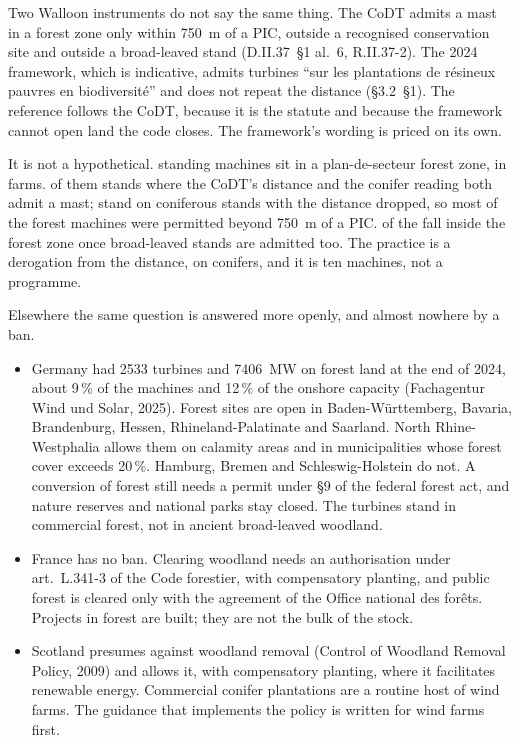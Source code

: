 \documentclass[11pt,a4paper]{article}
\begin{document}
Two Walloon instruments do not say the same thing. The CoDT admits a mast in a
forest zone only within \SI{750}{\metre} of a PIC, outside a recognised
conservation site and outside a broad-leaved stand (D.II.37~§1 al.~6,
R.II.37-2). The 2024 framework, which is indicative, admits turbines ``sur les
plantations de résineux pauvres en biodiversité'' and does not repeat the
distance (§3.2~§1). The reference follows the CoDT, because it is the statute
and because the framework cannot open land the code closes. The framework's
wording is priced on its own.

It is not a hypothetical. \FleetForestN{} standing machines sit in a
plan-de-secteur forest zone, in \FleetForestFarms{} farms. \FleetForestCodt{} of
them stands where the CoDT's distance and the conifer reading both admit a
mast; \FleetForestConif{} stand on coniferous stands with the distance dropped,
so most of the forest machines were permitted beyond \SI{750}{\metre} of a PIC.
\FleetForestAll{} of the \FleetForestN{} fall inside the forest zone once
broad-leaved stands are admitted too. The practice is a derogation from the
distance, on conifers, and it is ten machines, not a programme.

Elsewhere the same question is answered more openly, and almost nowhere by a
ban.

\begin{itemize}
  \item Germany had \num{2533} turbines and \SI{7406}{\mega\watt} on forest
    land at the end of 2024, about 9\,\% of the machines and 12\,\% of the
    onshore capacity (Fachagentur Wind und Solar, 2025). Forest sites are open
    in Baden-Württemberg, Bavaria, Brandenburg, Hessen, Rhineland-Palatinate
    and Saarland. North Rhine-Westphalia allows them on calamity areas and in
    municipalities whose forest cover exceeds 20\,\%. Hamburg, Bremen and
    Schleswig-Holstein do not. A conversion of forest still needs a permit
    under §9 of the federal forest act, and nature reserves and national parks
    stay closed. The turbines stand in commercial forest, not in ancient
    broad-leaved woodland.
  \item France has no ban. Clearing woodland needs an authorisation under
    art.~L.341-3 of the Code forestier, with compensatory planting, and public
    forest is cleared only with the agreement of the Office national des
    forêts. Projects in forest are built; they are not the bulk of the stock.
  \item Scotland presumes against woodland removal (Control of Woodland Removal
    Policy, 2009) and allows it, with compensatory planting, where it
    facilitates renewable energy. Commercial conifer plantations are a routine
    host of wind farms. The guidance that implements the policy is written for
    wind farms first.
\end{itemize}
\end{document}

